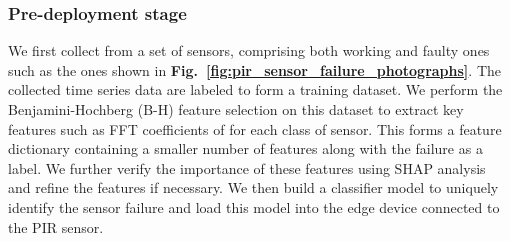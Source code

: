 


\subsubsection{Pre-deployment stage} 
\label{sebsec:pre_deploy} 
We first collect \aout from a set of sensors, comprising both working and faulty ones such as the ones shown in {\bfseries Fig.~\ref{fig:pir_sensor_failure_photographs}}. The collected time series data are labeled to form a training dataset. We perform the Benjamini-Hochberg (B-H) feature selection on this dataset to extract key features such as FFT coefficients of \aout for each class of sensor. This forms a feature dictionary containing a smaller number of features along with the failure as a label. We further verify the importance of these features using SHAP analysis and refine the features if necessary.
We then build a classifier model to uniquely identify the sensor failure and load this model into the edge device connected to the PIR sensor. 

